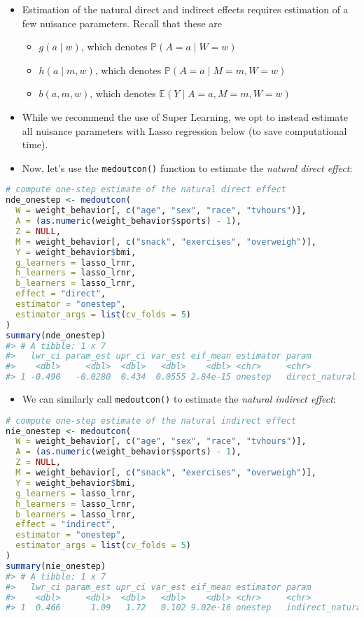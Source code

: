 \documentclass[
  12pt,
]{book}
\newcommand{\passthrough}[1]{#1}
\providecommand{\tightlist}{%
  \setlength{\itemsep}{0pt}\setlength{\parskip}{0pt}}
\theoremstyle{definition}
\theoremstyle{definition}
\theoremstyle{definition}
\renewcommand{\P}{\mathbb{P}}
\newcommand{\E}{\mathbb{E}}
\newcommand{\1}{\mathbbm{1}}
\begin{document}
\begin{itemize}
\tightlist
\item
  Estimation of the natural direct and indirect effects requires estimation of a
  few nuisance parameters. Recall that these are

  \begin{itemize}
  \tightlist
  \item
    \(g(a\mid w)\), which denotes \(\P(A=a \mid W=w)\)
  \item
    \(h(a\mid m, w)\), which denotes \(\P(A=a \mid M=m, W=w)\)
  \item
    \(b(a, m, w)\), which denotes \(\E(Y \mid A=a, M=m, W=w)\)
  \end{itemize}
\item
  While we recommend the use of Super Learning, we opt to instead estimate all
  nuisance parameters with Lasso regression below (to save computational time).
\item
  Now, let's use the \passthrough{\lstinline!medoutcon()!} function to estimate the \emph{natural direct
  effect}:
\end{itemize}

\begin{lstlisting}[language=R]
# compute one-step estimate of the natural direct effect
nde_onestep <- medoutcon(
  W = weight_behavior[, c("age", "sex", "race", "tvhours")],
  A = (as.numeric(weight_behavior$sports) - 1),
  Z = NULL,
  M = weight_behavior[, c("snack", "exercises", "overweigh")],
  Y = weight_behavior$bmi,
  g_learners = lasso_lrnr,
  h_learners = lasso_lrnr,
  b_learners = lasso_lrnr,
  effect = "direct",
  estimator = "onestep",
  estimator_args = list(cv_folds = 5)
)
summary(nde_onestep)
#> # A tibble: 1 x 7
#>   lwr_ci param_est upr_ci var_est eif_mean estimator param         
#>    <dbl>     <dbl>  <dbl>   <dbl>    <dbl> <chr>     <chr>         
#> 1 -0.490   -0.0280  0.434  0.0555 2.84e-15 onestep   direct_natural
\end{lstlisting}

\begin{itemize}
\tightlist
\item
  We can similarly call \passthrough{\lstinline!medoutcon()!} to estimate the \emph{natural indirect effect}:
\end{itemize}

\begin{lstlisting}[language=R]
# compute one-step estimate of the natural indirect effect
nie_onestep <- medoutcon(
  W = weight_behavior[, c("age", "sex", "race", "tvhours")],
  A = (as.numeric(weight_behavior$sports) - 1),
  Z = NULL,
  M = weight_behavior[, c("snack", "exercises", "overweigh")],
  Y = weight_behavior$bmi,
  g_learners = lasso_lrnr,
  h_learners = lasso_lrnr,
  b_learners = lasso_lrnr,
  effect = "indirect",
  estimator = "onestep",
  estimator_args = list(cv_folds = 5)
)
summary(nie_onestep)
#> # A tibble: 1 x 7
#>   lwr_ci param_est upr_ci var_est eif_mean estimator param           
#>    <dbl>     <dbl>  <dbl>   <dbl>    <dbl> <chr>     <chr>           
#> 1  0.466      1.09   1.72   0.102 9.02e-16 onestep   indirect_natural
\end{lstlisting}
\end{document}
